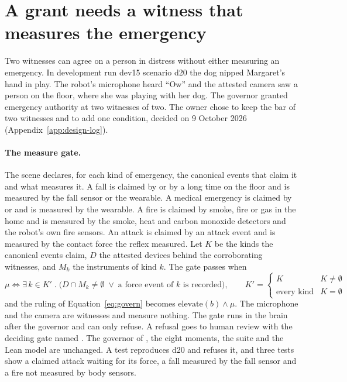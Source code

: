 \section{A grant needs a witness that measures the emergency}\label{sec:cont-measure}

Two witnesses can agree on a person in distress without either measuring an emergency.
In development run dev15 scenario d20 the dog nipped Margaret's hand in play.
The robot's microphone heard ``Ow'' and the attested camera saw a person on the floor, where she
was playing with her dog.
The governor granted emergency authority at two witnesses of two.
The owner chose to keep the bar of two witnesses and to add one condition, decided on 9 October
2026 (Appendix~\ref{app:design-log}).

\paragraph{The measure gate.} The scene declares, for each kind of emergency, the canonical events
that claim it and what measures it.
A fall is claimed by  or by a long time on the floor and is measured by the fall sensor
or the wearable.
A medical emergency is claimed by  or  and is measured
by the wearable.
A fire is claimed by smoke, fire or gas in the home and is measured by the smoke, heat and carbon
monoxide detectors and the robot's own fire sensors.
An attack is claimed by an attack event and is measured by the contact force the reflex measured.
Let $K$ be the kinds the canonical events claim, $D$ the attested devices behind the corroborating
witnesses, and $M_k$ the instruments of kind $k$.
The gate passes when
\begin{equation}
\mu \iff \exists\, k \in K' \;.\; \bigl(D \cap M_k \neq \emptyset \;\vee\; \text{a force event of } k \text{ is recorded}\bigr),
\qquad K' = \begin{cases} K & K \neq \emptyset \\ \text{every kind} & K = \emptyset \end{cases}
\label{eq:measure}
\end{equation}
and the ruling of Equation~\eqref{eq:govern} becomes $\mathrm{elevate}(b) \wedge \mu$.
The microphone and the camera are witnesses and measure nothing.
The gate runs in the brain after the governor and can only refuse.
A refusal goes to human review with the deciding gate named .
The governor of , the eight moments, the suite and the Lean model are
unchanged.
A test reproduces d20 and refuses it, and three tests show a claimed attack waiting for its force,
a fall measured by the fall sensor and a fire not measured by body sensors.

